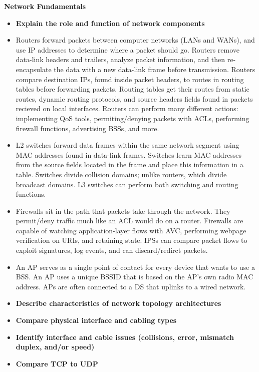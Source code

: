 \documentclass{article}
\begin{document}
\begin{flushleft}\textbf{Network Fundamentals}\end{flushleft}
\begin{itemize}
  \item \textbf{Explain the role and function of network components}
  	\item[] Routers forward packets between computer networks (LANs and WANs), and use IP addresses to determine where a packet should go. Routers remove data-link headers and trailers, analyze packet information, and then re-encapsulate the data with a new data-link frame before transmission. Routers compare destination IPs, found inside packet headers, to routes in routing tables before forwarding packets. Routing tables get their routes from static routes, dynamic routing protocols, and source headers fields found in packets recieved on local interfaces. Routers can perform many different actions: implementing QoS tools, permiting/denying packets with ACLs, performing firewall functions, advertising BSSs, and more. 
	\item[] L2 switches forward data frames within the same network segment using MAC addresses found in data-link frames. Switches learn MAC addresses from the source fields located in the frame and place this information in a table. Switches divide collision domains; unlike routers, which divide broadcast domains. L3 switches can perform both switching and routing functions.
	\item[] Firewalls sit in the path that packets take through the network. They permit/deny traffic much like an ACL would do on a router. Firewalls are capable of watching application-layer flows with AVC, performing webpage verification on URIs, and retaining state. IPSs can compare packet flows to exploit signatures, log events, and can discard/redirct packets.
	\item[] An AP serves as a single point of contact for every device that wants to use a BSS. An AP uses a unique BSSID that is based on the AP's own radio MAC address. APs are often connected to a DS that uplinks to a wired network.
  \item \textbf{Describe characteristics of network topology architectures}
  \item \textbf{Compare physical interface and cabling types}
  \item \textbf{Identify interface and cable issues (collisions, error, mismatch duplex, and/or speed)}
  \item \textbf{Compare TCP to UDP}

\end{itemize}
\end{document}
